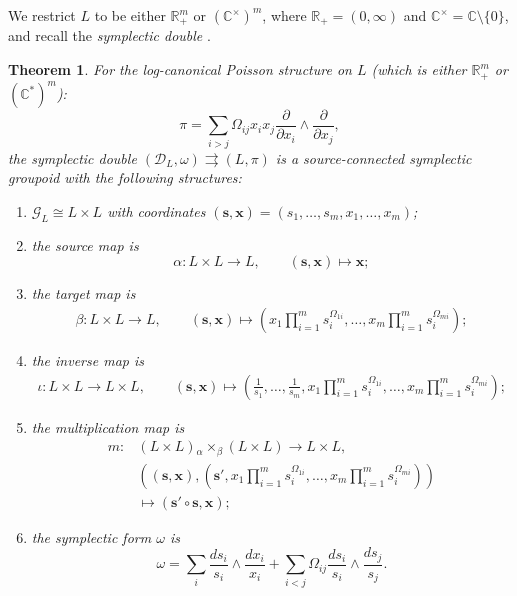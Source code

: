 \documentclass{amsart}
\newtheorem{theorem}{Theorem}[section]
\newcommand{\bfs}{\mathbf{s}}
\newcommand{\bfx}{\mathbf{x}}
\newcommand{\cG}{\mathcal{G}}
\newcommand{\cD}{\mathcal{D}}
\newcommand{\CC}{\mathbb{C}}
\newcommand{\RR}{\mathbb{R}}
\newcommand{\rra}{\rightrightarrows}
\begin{document}
We restrict $L$ to be either $\RR_+^m$ or $(\CC^\times)^m$, where $\RR_+ = (0, \infty)$ and $\CC^\times = \CC \setminus \{0\}$, and recall the \emph{symplectic double} \cite{MR2470108}.
\begin{theorem} 
  \cite{MR2470108}
  For the log-canonical Poisson structure on $L$ (which is either $\RR_+^m$ or $(\CC^*)^m$):
  \[\pi = \sum_{i > j} \Omega_{ij} x_i x_j\frac{\partial}{\partial x_i} \wedge \frac{\partial}{\partial x_j},\]
  the symplectic double $(\cD_L, \omega) \rra (L, \pi)$ is a source-connected symplectic groupoid with the following structures:
  \begin{enumerate}
    \item $\cG_L \cong L \times L$ with coordinates $(\bfs, \bfx) = (s_1, \ldots, s_m, x_1, \ldots, x_m)$;
    \item the source map is
      \[\alpha: L \times L \to L, \qquad (\bfs, \bfx) \mapsto \bfx;\]
    \item the target map is
      \[\begin{aligned}
	  \beta: L \times L \to L, \qquad (\bfs, \bfx) \mapsto \left(x_1 \prod_{i=1}^m s_i^{\Omega_{1i}}, \ldots, x_m \prod_{i=1}^m s_i^{\Omega_{mi}}\right);
        \end{aligned}\]
    \item the inverse map is
      \[\begin{aligned}
	  \iota: L \times L \to L \times L, \qquad (\bfs, \bfx) \mapsto \left(\frac{1}{s_1}, \ldots, \frac{1}{s_m}, x_1 \prod_{i=1}^m s_i^{\Omega_{1i}}, \ldots, x_m \prod_{i=1}^m s_i^{\Omega_{mi}}\right);
        \end{aligned}\]
    \item the multiplication map is
      \[\begin{aligned}
	  m: & \left(L \times L\right) {_\alpha \times_\beta} \left(L \times L\right) \to L \times L, \\
	     & \left((\bfs, \bfx), \left(\bfs', x_1 \prod_{i=1}^m s_i^{\Omega_{1i}}, \ldots, x_m \prod_{i=1}^m s_i^{\Omega_{mi}}\right)\right) \\
	     & \mapsto (\bfs' \circ \bfs, \bfx );
        \end{aligned}\]
    \item the symplectic form $\omega$ is
      \[\omega = \sum_{i} \frac{d s_i}{s_i} \wedge \frac{d x_i}{x_i} + \sum_{i < j} \Omega_{ij} \frac{d s_i}{s_i} \wedge \frac{d s_j}{s_j}.\]
  \end{enumerate}
\end{theorem}
\end{document}
